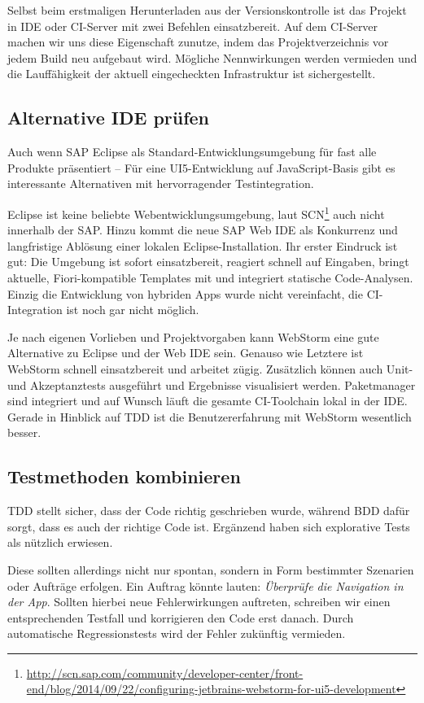 Selbst beim erstmaligen Herunterladen aus der Versionskontrolle ist das Projekt in IDE oder CI-Server mit zwei Befehlen einsatzbereit.
Auf dem CI-Server machen wir uns diese Eigenschaft zunutze, indem das Projektverzeichnis vor jedem Build neu aufgebaut wird. Mögliche Nennwirkungen werden vermieden und die Lauffähigkeit der aktuell eingecheckten Infrastruktur ist sichergestellt.

\subsection{Alternative IDE prüfen}
Auch wenn SAP Eclipse als Standard-Entwicklungsumgebung für fast alle Produkte präsentiert -- Für eine UI5-Entwicklung auf JavaScript-Basis gibt es interessante Alternativen mit hervorragender Testintegration. 

Eclipse ist keine beliebte Webentwicklungsumgebung, laut SCN\footnote{\url{http://scn.sap.com/community/developer-center/front-end/blog/2014/09/22/configuring-jetbrains-webstorm-for-ui5-development}} auch nicht innerhalb der SAP. Hinzu kommt die neue SAP Web IDE als Konkurrenz und langfristige Ablösung einer lokalen Eclipse-Installation. Ihr erster Eindruck ist gut: Die Umgebung ist sofort einsatzbereit, reagiert schnell auf Eingaben, bringt aktuelle, Fiori-kompatible Templates mit und integriert statische Code-Analysen. Einzig die Entwicklung von hybriden Apps wurde nicht vereinfacht, die CI-Integration ist noch gar nicht möglich.

Je nach eigenen Vorlieben und Projektvorgaben kann WebStorm eine gute Alternative zu Eclipse und der Web IDE sein. Genauso wie Letztere ist WebStorm schnell einsatzbereit und arbeitet zügig. Zusätzlich können auch Unit- und Akzeptanztests ausgeführt und Ergebnisse visualisiert werden. Paketmanager sind integriert und auf Wunsch läuft die gesamte CI-Toolchain lokal in der IDE. Gerade in Hinblick auf TDD ist die Benutzererfahrung mit WebStorm wesentlich besser.

\subsection{Testmethoden kombinieren}
TDD stellt sicher, dass der Code richtig geschrieben wurde, während BDD dafür sorgt, dass es auch der richtige Code ist.
Ergänzend haben sich explorative Tests als nützlich erwiesen. 

Diese sollten allerdings nicht nur spontan, sondern in Form bestimmter Szenarien oder Aufträge erfolgen. Ein Auftrag könnte lauten: \textit{Überprüfe die Navigation in der App}. Sollten hierbei neue Fehlerwirkungen auftreten, schreiben wir einen entsprechenden Testfall und korrigieren den Code erst danach. Durch automatische Regressionstests wird der Fehler zukünftig vermieden.

